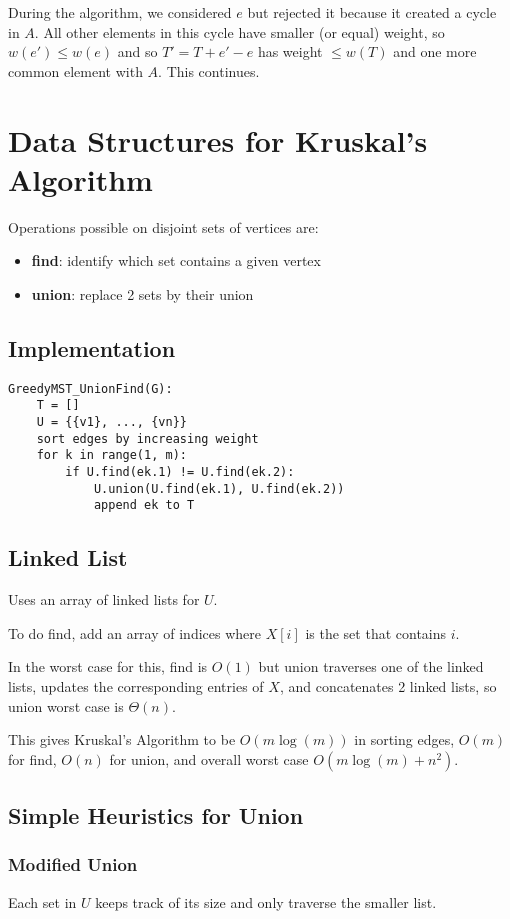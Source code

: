 \documentclass[11pt]{article}
\begin{document}
During the algorithm, we considered \(e\) but rejected it because it created a cycle in \(A\).
All other elements in this cycle have smaller (or equal) weight, so \(w(e') \le w(e)\) and so
\(T' = T + e' - e\) has weight \(\le w(T)\) and one more common element with \(A\). This continues.
\section{Data Structures for Kruskal's Algorithm}
\label{sec:orgd6b036d}
Operations possible on disjoint sets of vertices are:
\begin{itemize}
\item \textbf{find}: identify which set contains a given vertex
\item \textbf{union}: replace 2 sets by their union
\end{itemize}
\subsection{Implementation}
\label{sec:orgc5f0f30}
\begin{verbatim}
GreedyMST_UnionFind(G):
    T = []
    U = {{v1}, ..., {vn}}
    sort edges by increasing weight
    for k in range(1, m):
        if U.find(ek.1) != U.find(ek.2):
            U.union(U.find(ek.1), U.find(ek.2))
            append ek to T
\end{verbatim}
\subsection{Linked List}
\label{sec:orgf4d7cbf}
Uses an array of linked lists for \(U\).

To do find, add an array of indices where \(X[i]\) is the set that contains \(i\).

In the worst case for this, find is \(O(1)\) but union traverses one of the linked lists,
updates the corresponding entries of \(X\), and concatenates 2 linked lists,
so union worst case is \(\Theta(n)\).

This gives Kruskal's Algorithm to be \(O(m \log(m))\) in sorting edges, \(O(m)\) for find,
\(O(n)\) for union, and overall worst case \(O(m \log(m) + n^{2})\).
\subsection{Simple Heuristics for Union}
\label{sec:org777ed7f}
\subsubsection{Modified Union}
\label{sec:org04f4c16}
Each set in \(U\) keeps track of its size and only traverse the smaller list.
\end{document}
